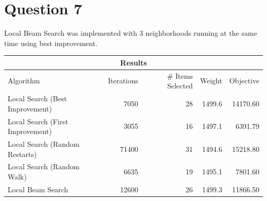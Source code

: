 \documentclass[12pt, letterpaper]{article}
\begin{document}
\section*{Question 7}

Local Beam Search was implemented with 3 neighborhoods running at the same time using best improvement. 

\begin{center}
\begin{tabular}{ l r r r r } 

 \multicolumn{5}{c}{Results} \\
 \hline
Algorithm & Iterations & \# Items Selected & Weight & Objective \\
 \hline 
Local Search (Best Improvement) & 7050 & 28 & 1499.6 & 14170.60 \\
Local Search (First Improvement) & 3055 & 16 & 1497.1 & 6391.79\\
Local Search (Random Restarts) & 71400 & 31 & 1494.6 & 15218.80\\
Local Search (Random Walk) & 6635 & 19 & 1495.1 & 7801.60\\
Local Beam Search & 12600 & 26 & 1499.3 & 11866.50\\
 \hline
\end{tabular}
\end{center}
\end{document}
